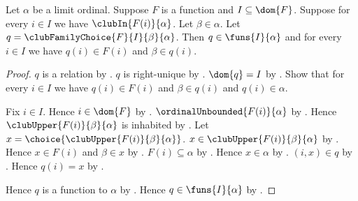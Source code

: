 \begin{proposition}\label{club_family_choice_type}
    Let $\alpha$ be a limit ordinal.
    Suppose $F$ is a function and $I\subseteq\dom{F}$.
    Suppose for every $i\in I$ we have $\clubIn{F(i)}{\alpha}$.
    Let $\beta\in\alpha$.
    Let $q=\clubFamilyChoice{F}{I}{\beta}{\alpha}$.
    Then $q\in\funs{I}{\alpha}$ and for every $i\in I$ we have
        $q(i)\in F(i)$ and $\beta\in q(i)$.
\end{proposition}
\begin{proof}
    $q$ is a relation by .
    $q$ is right-unique
        by .
    $\dom{q}=I$
        by .
    Show that for every $i\in I$ we have
        $q(i)\in F(i)$ and $\beta\in q(i)$ and $q(i)\in\alpha$.
    \begin{subproof}
        Fix $i\in I$.
        Hence $i\in\dom{F}$ by .
        $\ordinalUnbounded{F(i)}{\alpha}$
            by .
        Hence $\clubUpper{F(i)}{\beta}{\alpha}$ is inhabited
            by .
        Let $x=\choice{\clubUpper{F(i)}{\beta}{\alpha}}$.
        $x\in\clubUpper{F(i)}{\beta}{\alpha}$ by .
        Hence $x\in F(i)$ and $\beta\in x$
            by .
        $F(i)\subseteq\alpha$ by .
        Hence $x\in\alpha$ by .
        $(i,x)\in q$ by .
        Hence $q(i)=x$ by .
    \end{subproof}
    Hence $q$ is a function to $\alpha$ by \auto.
    Hence $q\in\funs{I}{\alpha}$ by .
\end{proof}

